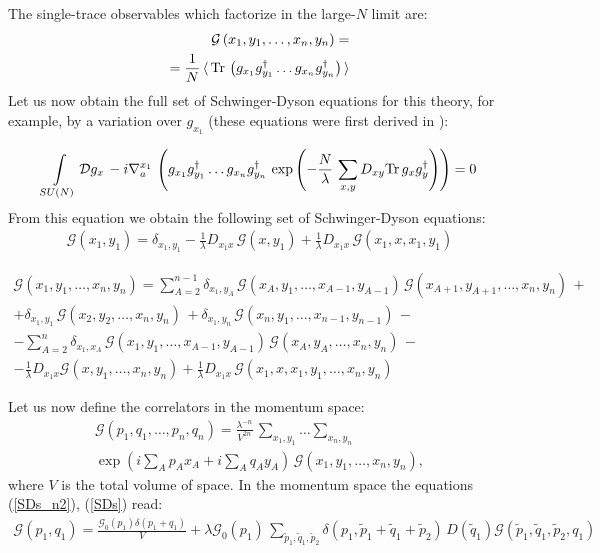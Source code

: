 \documentclass[twocolumn,showpacs,preprintnumbers,superscriptaddress,amsmath,floatfix,amssymb,secnumarabic]{revtex4}
\newcommand{\G}{\mathcal{G}}
\newcommand{\lr}[1]{ \left( #1 \right) }
\newcommand{\vev}[1]{ \langle \, #1 \, \rangle }
\newcommand{\tr}{ {\rm Tr} \, }
\newcommand{\expa}[1]{ \exp{\left( #1 \right)} }
\begin{document}
The single-trace observables which factorize in the large-$N$ limit are:
\begin{eqnarray}
\label{gf_def}
\G\lr{x_1, y_1, \ldots, x_n, y_n}
= \nonumber \\ =
\frac{1}{N}\, \vev{ \tr\lr{
g_{x_1} g^{\dag}_{y_1} \ldots g_{x_n} g^{\dag}_{y_n}} }
\end{eqnarray}
Let us now obtain the full set of Schwinger-Dyson equations for this theory, for example, by a variation over $g_{x_1}$ (these equations were first derived in \cite{GonzalezArroyo:84:1}):
\begin{widetext}
\begin{eqnarray}
\label{SD_derivation1}
\int\limits_{SU\lr{N}} \mathcal{D} g_{x} \, -i \nabla_a^{x_1} \,
\lr{g_{x_1} g^{\dag}_{y_1} \ldots g_{x_n} g^{\dag}_{y_n} \, \expa{ -\frac{N}{\lambda}\, \sum \limits_{x,y} D_{xy} \tr g_x g^{\dag}_y} } = 0
\end{eqnarray}
From this equation we obtain the following set of Schwinger-Dyson equations:
\begin{eqnarray}
\label{SDs_n2}
\G\lr{x_1, y_1} =
\delta_{x_1, y_1}
 - %
\frac{1}{\lambda} D_{x_1 x} \, \G\lr{x, y_1}
 +
\frac{1}{\lambda} D_{x_1 x} \, \G\lr{x_1, x, x_1, y_1}
\end{eqnarray}

\begin{eqnarray}
\label{SDs}
\G\lr{x_1, y_1, \ldots, x_n, y_n}
= %
\sum\limits_{A=2}^{n-1} \delta_{x_1, y_A} \,
\G\lr{x_A, y_1, \ldots, x_{A-1}, y_{A-1}}\,
\G\lr{x_{A+1}, y_{A+1}, \ldots, x_n, y_n}\,
+ \nonumber \\ +
\delta_{x_1, y_1} \, \G\lr{x_2, y_2, \ldots, x_n, y_n}\,
+
\delta_{x_1, y_n} \, \G\lr{x_n, y_1, \ldots, x_{n-1}, y_{n-1}}\,
- \nonumber \\ -
\sum\limits_{A=2}^{n} \delta_{x_1, x_A} \,
 \G\lr{x_1, y_1, \ldots, x_{A-1}, y_{A-1}}\,
 \G\lr{x_A, y_A, \ldots, x_n, y_n}\,
- \nonumber \\ -
\frac{1}{\lambda} D_{x_1 x} \G\lr{x, y_1, \ldots, x_n, y_n}
+
\frac{1}{\lambda} D_{x_1 x} \, \G\lr{x_1, x, x_1, y_1, \ldots, x_n, y_n}
\end{eqnarray}

Let us now define the correlators in the momentum space:
\begin{eqnarray}
\label{momentum_space_def}
\G\lr{p_1, q_1, \ldots, p_n, q_n} = \frac{\lambda^{-n}}{V^{2 n}} \,
\sum\limits_{x_1, y_1} \ldots \sum\limits_{x_n, y_n} \,
\nonumber \\
\expa{i \sum\limits_A p_A x_A + i \sum\limits_A q_A y_A} \,
\G\lr{x_1, y_1, \ldots, x_n, y_n}  ,
\end{eqnarray}
where $V$ is the total volume of space. In the momentum space the equations (\ref{SDs_n2}), (\ref{SDs}) read:
\begin{eqnarray}
\label{SDs_n2_momentum}
 \G\lr{p_1, q_1} = \frac{\G_0\lr{p_1} \delta\lr{p_1 + q_1}}{V}
 +
 \lambda \G_0\lr{p_1} \,
\sum\limits_{\tilde{p}_1, \tilde{q}_1, \tilde{p}_2}
\delta\lr{p_1, \tilde{p}_1 + \tilde{q}_1 + \tilde{p}_2} \,
D\lr{\tilde{q}_1} \G\lr{\tilde{p}_1, \tilde{q}_1, \tilde{p}_2, q_1}
\end{eqnarray}


\end{widetext}
\end{document}
